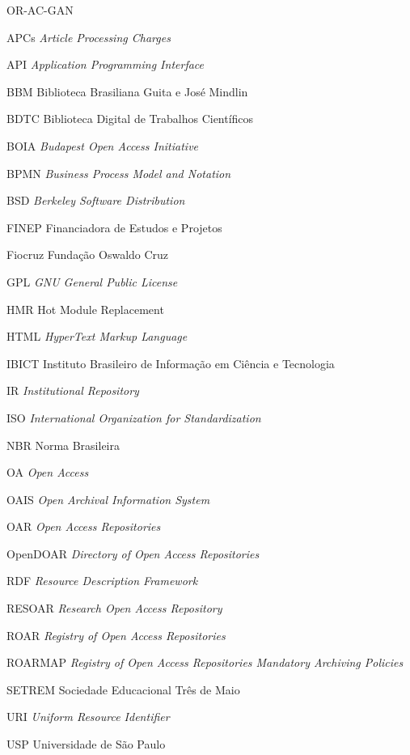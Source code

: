\documentclass[diss]{template/setrem}
\begin{document}
\begin{listofabbrv}{OR-AC-GAN} %
    \item[APCs] {\emph{Article Processing Charges}}
    \item[API] {\emph{Application Programming Interface}}
    \item[BBM] {Biblioteca Brasiliana Guita e José Mindlin}
    \item[BDTC] {Biblioteca Digital de Trabalhos Científicos}
    \item[BOIA] {\emph{Budapest Open Access Initiative}}
    \item[BPMN] {\emph{Business Process Model and Notation}}
    \item[BSD] {\emph{Berkeley Software Distribution}}
    \item[FINEP] {Financiadora de Estudos e Projetos}
    \item[Fiocruz] {Fundação Oswaldo Cruz}
    \item[GPL] {\emph{GNU General Public License}}
    \item[HMR] {Hot Module Replacement}
    \item[HTML] {\emph{HyperText Markup Language}}
    \item[IBICT] {Instituto Brasileiro de Informação em Ciência e Tecnologia}
    \item[IR] {\emph{Institutional Repository}}
    \item[ISO] {\emph{International Organization for Standardization}}
    \item[NBR] {Norma Brasileira}
    \item[OA] {\emph{Open Access}}
    \item[OAIS] {\emph{Open Archival Information System}}
    \item[OAR] {\emph{Open Access Repositories}}
    \item[OpenDOAR] {\emph{Directory of Open Access Repositories}}
    \item[RDF] {\emph{Resource Description Framework }}
    \item[RESOAR] {\emph{Research Open Access Repository}}
    \item[ROAR] {\emph{Registry of Open Access Repositories}}
    \item[ROARMAP] {\emph{Registry of Open Access Repositories Mandatory Archiving Policies}}
    \item[SETREM] {Sociedade Educacional Três de Maio}
    \item[URI] {\emph{Uniform Resource Identifier}}
    \item[USP] {Universidade de São Paulo}
\end{listofabbrv}

% 
\tableofcontents

\pagestyle{empty}
{
    
}






%




\end{document}
